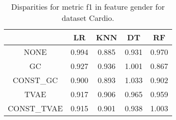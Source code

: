 \begin{table}
\caption{Disparities for metric f1 in feature gender for dataset Cardio.}
\label{tab:disp-CARDIO-gender-f1}
\begin{tabular}{ccccc}
\toprule
 & LR & KNN & DT & RF \\
\midrule
NONE & 0.994 & 0.885 & 0.931 & 0.970 \\
GC & 0.927 & 0.936 & 1.001 & 0.867 \\
CONST\_GC & 0.900 & 0.893 & 1.033 & 0.902 \\
TVAE & 0.917 & 0.906 & 0.965 & 0.959 \\
CONST\_TVAE & 0.915 & 0.901 & 0.938 & 1.003 \\
\bottomrule
\end{tabular}
\end{table}
